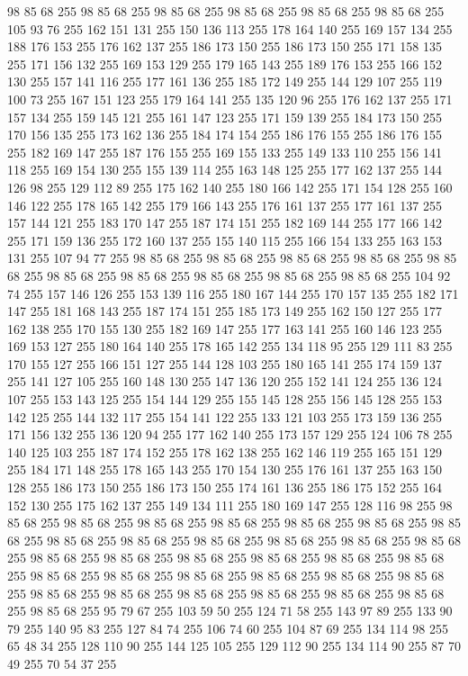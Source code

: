 98 85 68 255 98 85 68 255 98 85 68 255 98 85 68 255 98 85 68 255 98 85 68 255 105 93 76 255 162 151 131 255 150 136 113 255 178 164 140 255 169 157 134 255 188 176 153 255 176 162 137 255 186 173 150 255 186 173 150 255 171 158 135 255 171 156 132 255 169 153 129 255 179 165 143 255 189 176 153 255 166 152 130 255 157 141 116 255 177 161 136 255 185 172 149 255 144 129 107 255 119 100 73 255 167 151 123 255 179 164 141 255 135 120 96 255 176 162 137 255 171 157 134 255 159 145 121 255 161 147 123 255 171 159 139 255 184 173 150 255 170 156 135 255 173 162 136 255 184 174 154 255 186 176 155 255 186 176 155 255 182 169 147 255 187 176 155 255 169 155 133 255 149 133 110 255 156 141 118 255 169 154 130 255 155 139 114 255 163 148 125 255 177 162 137 255 144 126 98 255 129 112 89 255 175 162 140 255 180 166 142 255 171 154 128 255 160 146 122 255 178 165 142 255 179 166 143 255 176 161 137 255 177 161 137 255 157 144 121 255 183 170 147 255 187 174 151 255 182 169 144 255 177 166 142 255
171 159 136 255 172 160 137 255 155 140 115 255 166 154 133 255 163 153 131 255 107 94 77 255 98 85 68 255 98 85 68 255 98 85 68 255 98 85 68 255 98 85 68 255 98 85 68 255 98 85 68 255 98 85 68 255 98 85 68 255 98 85 68 255 104 92 74 255 157 146 126 255 153 139 116 255 180 167 144 255 170 157 135 255 182 171 147 255 181 168 143 255 187 174 151 255 185 173 149 255 162 150 127 255 177 162 138 255 170 155 130 255 182 169 147 255 177 163 141 255 160 146 123 255 169 153 127 255 180 164 140 255 178 165 142 255 134 118 95 255 129 111 83 255 170 155 127 255 166 151 127 255 144 128 103 255 180 165 141 255 174 159 137 255 141 127 105 255 160 148 130 255 147 136 120 255 152 141 124 255 136 124 107 255 153 143 125 255 154 144 129 255 155 145 128 255 156 145 128 255 153 142 125 255 144 132 117 255 154 141 122 255 133 121 103 255 173 159 136 255 171 156 132 255 136 120 94 255 177 162 140 255 173 157 129 255 124 106 78 255 140 125 103 255 187 174 152 255 178 162 138 255 162 146 119 255
165 151 129 255 184 171 148 255 178 165 143 255 170 154 130 255 176 161 137 255 163 150 128 255 186 173 150 255 186 173 150 255 174 161 136 255 186 175 152 255 164 152 130 255 175 162 137 255 149 134 111 255 180 169 147 255 128 116 98 255 98 85 68 255 98 85 68 255 98 85 68 255 98 85 68 255 98 85 68 255 98 85 68 255 98 85 68 255 98 85 68 255 98 85 68 255 98 85 68 255 98 85 68 255 98 85 68 255 98 85 68 255 98 85 68 255 98 85 68 255 98 85 68 255 98 85 68 255 98 85 68 255 98 85 68 255 98 85 68 255 98 85 68 255 98 85 68 255 98 85 68 255 98 85 68 255 98 85 68 255 98 85 68 255 98 85 68 255 98 85 68 255 98 85 68 255 98 85 68 255 98 85 68 255 98 85 68 255 95 79 67 255 103 59 50 255 124 71 58 255 143 97 89 255 133 90 79 255 140 95 83 255 127 84 74 255 106 74 60 255 104 87 69 255 134 114 98 255 65 48 34 255 128 110 90 255 144 125 105 255 129 112 90 255 134 114 90 255 87 70 49 255 70 54 37 255
